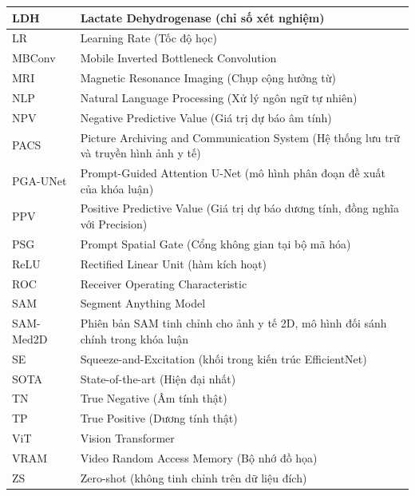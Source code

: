 \begin{longtable}{|>{\raggedright\arraybackslash}p{3.2cm}|p{10.8cm}|}
LDH & Lactate Dehydrogenase (chỉ số xét nghiệm) \\ \hline
LR & Learning Rate (Tốc độ học) \\ \hline
MBConv & Mobile Inverted Bottleneck Convolution \\ \hline
MRI & Magnetic Resonance Imaging (Chụp cộng hưởng từ) \\ \hline
NLP & Natural Language Processing (Xử lý ngôn ngữ tự nhiên) \\ \hline
NPV & Negative Predictive Value (Giá trị dự báo âm tính) \\ \hline
PACS & Picture Archiving and Communication System (Hệ thống lưu trữ và truyền hình ảnh y tế) \\ \hline
PGA-UNet & Prompt-Guided Attention U-Net (mô hình phân đoạn đề xuất của khóa luận) \\ \hline
PPV & Positive Predictive Value (Giá trị dự báo dương tính, đồng nghĩa với Precision) \\ \hline
PSG & Prompt Spatial Gate (Cổng không gian tại bộ mã hóa) \\ \hline
ReLU & Rectified Linear Unit (hàm kích hoạt) \\ \hline
ROC & Receiver Operating Characteristic \\ \hline
SAM & Segment Anything Model \\ \hline
SAM-Med2D & Phiên bản SAM tinh chỉnh cho ảnh y tế 2D, mô hình đối sánh chính trong khóa luận \\ \hline
SE & Squeeze-and-Excitation (khối trong kiến trúc EfficientNet) \\ \hline
SOTA & State-of-the-art (Hiện đại nhất) \\ \hline
TN & True Negative (Âm tính thật) \\ \hline
TP & True Positive (Dương tính thật) \\ \hline
ViT & Vision Transformer \\ \hline
VRAM & Video Random Access Memory (Bộ nhớ đồ họa) \\ \hline
ZS & Zero-shot (không tinh chỉnh trên dữ liệu đích) \\ \hline
\end{longtable}
